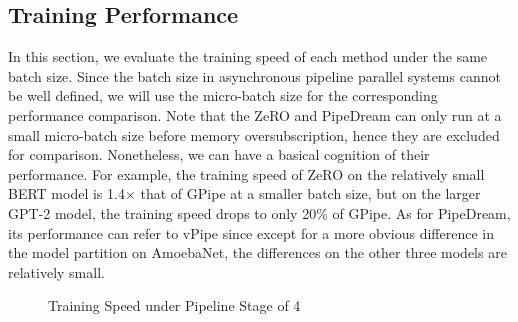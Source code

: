 \subsection{Training Performance}
In this section, we evaluate the training speed of each method under the same batch size.
Since the batch size in asynchronous pipeline parallel systems cannot be well defined,
we will use the micro-batch size for the corresponding performance comparison.
Note that the ZeRO and PipeDream can only run at a small micro-batch size
before memory oversubscription, hence they are excluded for comparison.
Nonetheless, we can have a basical cognition of their performance.
For example, the training speed of ZeRO on the relatively small BERT model
is 1.4$\times$ that of GPipe at a smaller batch size,
but on the larger GPT-2 model, the training speed drops to only 20\% of GPipe.
As for PipeDream, its performance can refer to vPipe
since except for a more obvious difference in the model partition on AmoebaNet,
the differences on the other three models are relatively small.
\begin{figure}[htb]
  \centering
  \caption{Training Speed under Pipeline Stage of 4}
  \label{fig:perf-4}
\end{figure}



